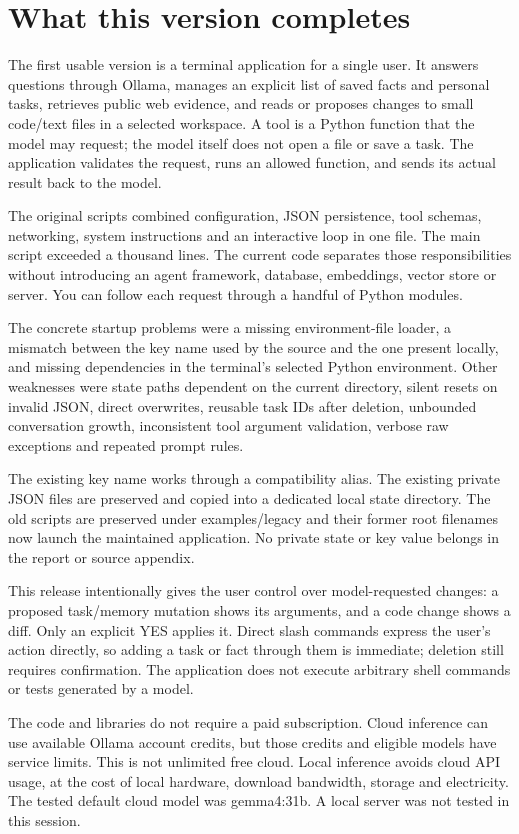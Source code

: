 \chapter{What this version completes}

The first usable version is a terminal application for a single user. It answers questions through Ollama, manages an explicit list of saved facts and personal tasks, retrieves public web evidence, and reads or proposes changes to small code/text files in a selected workspace. A tool is a Python function that the model may request; the model itself does not open a file or save a task. The application validates the request, runs an allowed function, and sends its actual result back to the model.

The original scripts combined configuration, JSON persistence, tool schemas, networking, system instructions and an interactive loop in one file. The main script exceeded a thousand lines. The current code separates those responsibilities without introducing an agent framework, database, embeddings, vector store or server. You can follow each request through a handful of Python modules.

The concrete startup problems were a missing environment-file loader, a mismatch between the key name used by the source and the one present locally, and missing dependencies in the terminal's selected Python environment. Other weaknesses were state paths dependent on the current directory, silent resets on invalid JSON, direct overwrites, reusable task IDs after deletion, unbounded conversation growth, inconsistent tool argument validation, verbose raw exceptions and repeated prompt rules.

The existing key name works through a compatibility alias. The existing private JSON files are preserved and copied into a dedicated local state directory. The old scripts are preserved under examples/legacy and their former root filenames now launch the maintained application. No private state or key value belongs in the report or source appendix.

This release intentionally gives the user control over model-requested changes: a proposed task/memory mutation shows its arguments, and a code change shows a diff. Only an explicit YES applies it. Direct slash commands express the user's action directly, so adding a task or fact through them is immediate; deletion still requires confirmation. The application does not execute arbitrary shell commands or tests generated by a model.

The code and libraries do not require a paid subscription. Cloud inference can use available Ollama account credits, but those credits and eligible models have service limits. This is not unlimited free cloud. Local inference avoids cloud API usage, at the cost of local hardware, download bandwidth, storage and electricity. The tested default cloud model was gemma4:31b. A local server was not tested in this session.

